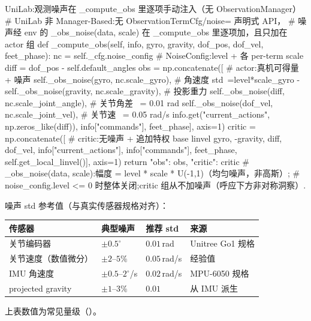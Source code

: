 \begin{codebox}[Python]{UniLab:观测噪声在 \_compute\_obs 里逐项手动注入（无 ObservationManager）}
# UniLab 非 Manager-Based:无 ObservationTermCfg/noise= 声明式 API，
# 噪声经 env 的 _obs_noise(data, scale) 在 _compute_obs 里逐项加，且只加在 actor 组
def _compute_obs(self, info, gyro, gravity, dof_pos, dof_vel, feet_phase):
    nc = self._cfg.noise_config           # NoiseConfig:level + 各 per-term scale
    diff = dof_pos - self.default_angles
    obs = np.concatenate([                # actor:真机可得量 + 噪声
        self._obs_noise(gyro, nc.scale_gyro),          # 角速度 std~=level*scale_gyro
        -self._obs_noise(gravity, nc.scale_gravity),   # 投影重力
        self._obs_noise(diff, nc.scale_joint_angle),   # 关节角差 ~= 0.01 rad
        self._obs_noise(dof_vel, nc.scale_joint_vel),  # 关节速 ~= 0.05 rad/s
        info.get("current_actions", np.zeros_like(diff)),
        info["commands"], feet_phase], axis=1)
    critic = np.concatenate([             # critic:无噪声 + 追加特权 base linvel
        gyro, -gravity, diff, dof_vel, info["current_actions"],
        info["commands"], feet_phase, self.get_local_linvel()], axis=1)
    return {"obs": obs, "critic": critic}
# _obs_noise(data, scale):幅度 = level * scale * U(-1,1)（均匀噪声，非高斯）;
#   noise_config.level <= 0 时整体关闭;critic 组从不加噪声（呼应下方非对称洞察）.
\end{codebox}

噪声 std 参考值（与真实传感器规格对齐）：

\begin{center}
\small
\begin{tabular}{@{}llll@{}}
\toprule
传感器 & 典型噪声 & 推荐 std & 来源 \\
\midrule
关节编码器 & $\pm 0.5^\circ$ & $0.01$\,rad & Unitree Go1 规格 \\
关节速度（数值微分） & $\pm 2$--$5\%$ & $0.05$\,rad/s & 经验值 \\
IMU 角速度 & $\pm 0.5$--$2^\circ$/s & $0.02$\,rad/s & MPU-6050 规格 \\
projected gravity & $\pm 1$--$3\%$ & $0.01$ & 从 IMU 派生 \\
\bottomrule
\end{tabular}
\end{center}

\begin{finenote}
上表数值为常见量级（）。
\end{finenote}

